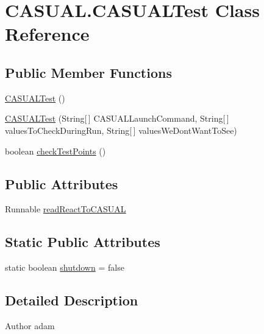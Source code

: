 \hypertarget{classCASUAL_1_1CASUALTest}{\section{C\-A\-S\-U\-A\-L.\-C\-A\-S\-U\-A\-L\-Test Class Reference}
\label{classCASUAL_1_1CASUALTest}
}
\subsection*{Public Member Functions}
\begin{DoxyCompactItemize}
\item 
\hyperlink{classCASUAL_1_1CASUALTest_a0f63b557bad0346492822a20cd8adeed}{C\-A\-S\-U\-A\-L\-Test} ()
\item 
\hyperlink{classCASUAL_1_1CASUALTest_a94f22a37a73613e0fa6e36cd706b7d6a}{C\-A\-S\-U\-A\-L\-Test} (String\mbox{[}$\,$\mbox{]} C\-A\-S\-U\-A\-L\-Launch\-Command, String\mbox{[}$\,$\mbox{]} values\-To\-Check\-During\-Run, String\mbox{[}$\,$\mbox{]} values\-We\-Dont\-Want\-To\-See)
\item 
boolean \hyperlink{classCASUAL_1_1CASUALTest_aa55a58b3eb667cfad90f002549062d51}{check\-Test\-Points} ()
\end{DoxyCompactItemize}
\subsection*{Public Attributes}
\begin{DoxyCompactItemize}
\item 
Runnable \hyperlink{classCASUAL_1_1CASUALTest_a96c1d034054c2e980ed6e32da5ac04f5}{read\-React\-To\-C\-A\-S\-U\-A\-L}
\end{DoxyCompactItemize}
\subsection*{Static Public Attributes}
\begin{DoxyCompactItemize}
\item 
static boolean \hyperlink{classCASUAL_1_1CASUALTest_a3d022b59ea55fa0e2282e38fbd3eb102}{shutdown} = false
\end{DoxyCompactItemize}


\subsection{Detailed Description}
\begin{DoxyAuthor}{Author}
adam 
\end{DoxyAuthor}



